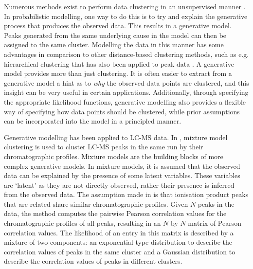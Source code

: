 Numerous methods exist to perform data clustering in an unsupervised manner \cite{xu2005survey, Jain2010}. In probabilistic modelling, one way to do this is to try and explain the generative process that produces the observed data. This results in a generative model. Peaks generated from the same underlying cause in the model can then be assigned to the same cluster. Modelling the data in this manner has some advantages in comparison to other distance-based clustering methods, such as e.g. hierarchical clustering that has also been applied to peak data \cite{DeSouza2006, Frank2007}. A generative model provides more than just clustering. It is often easier to extract from a generative model a hint as to \emph{why} the observed data points are clustered, and this insight can be very useful in certain applications. Additionally, through specifying the appropriate likelihood functions, generative modelling also provides a flexible way of specifying how data points should be clustered, while prior assumptions can be incorporated into the model in a principled manner.

Generative modelling has been applied to LC-MS data. In \cite{Rogers2012}, mixture model clustering is used to cluster LC-MS peaks in the same run by their chromatographic profiles. Mixture models are the building blocks of more complex generative models. In mixture models, it is assumed that the observed data can be explained by the presence of some latent variables. These variables are `latent' as they are not directly observed, rather their presence is inferred from the observed data. The assumption made in \cite{Rogers2012} is that ionisation product peaks that are related share similar chromatographic profiles. Given $N$ peaks in the data, the method computes the pairwise Pearson correlation values for the chromatographic profiles of all peaks, resulting in an $N$-by-$N$ matrix of Pearson correlation values. The likelihood of an entry in this matrix is described by a mixture of two components: an exponential-type distribution to describe the correlation values of peaks in the same cluster and a Gaussian distribution to describe the correlation values of peaks in different clusters. 

